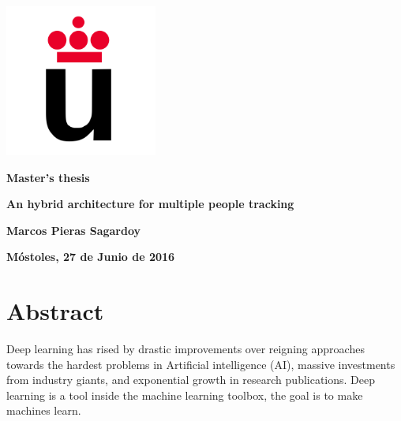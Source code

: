 \documentclass[12pt, a4paper, titlepage,twoside,openright]{article}
\begin{document}
	

\begin{titlepage}
\centering		
\includegraphics[width=5cm]{Logo_URJC.png}


\vspace{1cm}

\begin{center}
	
	\Large{\textbf{Master's thesis}}
	
	
	\vspace{4cm}
	
	\Huge
	\textbf{An hybrid architecture for multiple people tracking}
		
	
\end{center}

\vspace{6.2cm}

\begin{flushright}
	
\large


\textbf{Marcos Pieras Sagardoy}

\vspace{1.4cm}
	
\normalsize
\textbf{Móstoles, 27 de Junio de 2016}
	
	
\end{flushright}


\end{titlepage}


\tableofcontents

\clearpage

\section{Abstract}

Deep learning has rised by drastic improvements over reigning approaches towards the hardest problems in Artificial intelligence (AI), massive investments from industry giants, and exponential growth in research publications. Deep learning is a tool inside the machine learning toolbox, the goal is to make machines learn.
\end{document}
